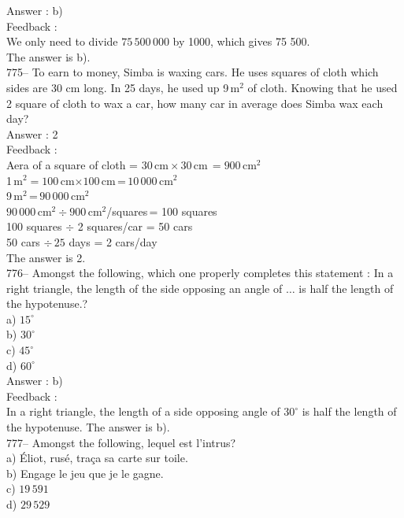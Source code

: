 \documentclass[letterpaper, 12pt]{article}
\begin{document}
Answer : b)\\

Feedback : \\
We only need to divide $75\,500\,000$ by 1000, which gives 75 500.\\
The answer is b).\\

775-- To earn to money, Simba is waxing cars. He uses squares of cloth which sides are 30 cm long. In 25 days, he used up 9\,m$^{2}$ of cloth. Knowing that he used 2 square of cloth to wax a car, how many car in average does Simba wax each day? \\

Answer : 2\\

Feedback : \\
Aera of a square of cloth = $30$\,cm\,$\times\,30$\,cm$\,=900$\,cm$^{2}$\\
1\,m$^{2}=100$\,cm$\times100$\,cm\,=\,$10\,000$\,cm$^{2}$\\
9\,m$^{2}$\,=\,$90\,000$\,cm$^{2}$\\
$90\,000$\,cm$^{2}\div900$\,cm$^{2}$/squares\,= 100 squares\\
100 squares $\div$ 2 squares/car  = 50 cars\\
50 cars $\div \,25 $ days = 2 cars/day\\
The answer is 2.\\

776-- Amongst the following, which one properly completes this statement : \og In a right triangle, the length of the side opposing an angle of $\ldots$ is half the length of the hypotenuse.\fg ?\\
a) $15^{\circ}$\\
b) $30^{\circ}$\\
c) $45^{\circ}$\\
d) $60^{\circ}$\\

Answer : b)\\

Feedback : \\
In a right triangle, the length of a side opposing angle of $30^{\circ}$ is half the length of the hypotenuse. The answer is b).\\


777-- Amongst the following, lequel est l'intrus?\\
a) \'Eliot, rus\'e, tra\c ca sa carte sur toile.\\
b) Engage le jeu que je le gagne.\\
c) $19\,591$\\
d) $29\,529$\\
\end{document}
